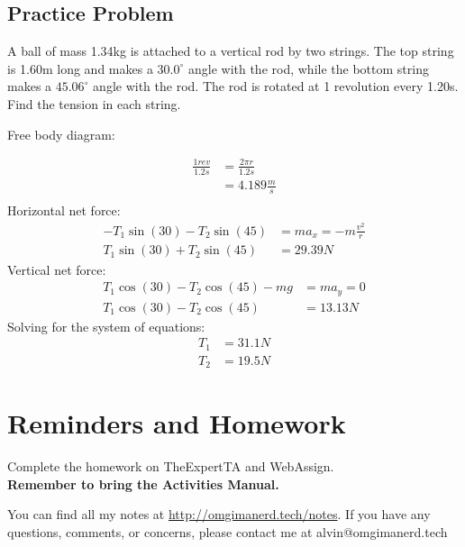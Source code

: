 \documentclass[letterpaper, 12pt]{math}
\begin{document}
\subsection*{Practice Problem}
A ball of mass 1.34kg is attached to a vertical rod by two strings. The top
string is 1.60m long and makes a \( 30.0^{\circ} \) angle with the rod, while
the bottom string makes a \( 45.06^{\circ} \) angle with the rod. The rod is
rotated at 1 revolution every 1.20s. Find the tension in each string.
\begin{center}
\end{center}
Free body diagram:
\begin{center}
\end{center}
\begin{align*}
  \frac{1rev}{1.2s} &= \frac{2\pi r}{1.2s} \\
  &= 4.189\frac{m}{s} \\
\end{align*}
Horizontal net force:
\begin{align*}
  -T_1\sin(30)-T_2\sin(45) &= ma_x = -m\frac{v^2}{r} \\
  T_1\sin(30)+T_2\sin(45) &= 29.39N
\end{align*}
Vertical net force:
\begin{align*}
  T_1\cos(30)-T_2\cos(45)-mg &= ma_y = 0 \\
  T_1\cos(30)-T_2\cos(45) &= 13.13N
\end{align*}
Solving for the system of equations:
\begin{align*}
  T_1 &= 31.1N \\
  T_2 &= 19.5N
\end{align*}

\section*{Reminders and Homework}
Complete the homework on TheExpertTA and WebAssign. \\
\textbf{Remember to bring the Activities Manual.} \\

\begin{center}
  You can find all my notes at \url{http://omgimanerd.tech/notes}. If you have
  any questions, comments, or concerns, please contact me at
  alvin@omgimanerd.tech
\end{center}
\end{document}
